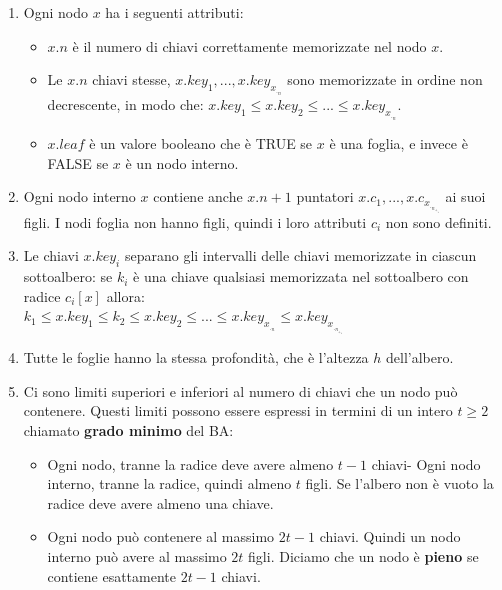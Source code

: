 \begin{enumerate}
    \item Ogni nodo $x$ ha i seguenti attributi:
    \begin{itemize}
        \item $x.n$ è il numero di chiavi correttamente memorizzate nel nodo $x$.
        \item Le $x.n$ chiavi stesse, $x.key_1,...,x.key_x_._n$ sono memorizzate in ordine non decrescente, in modo che: \(x.key_1\leq x.key_2\leq ...\leq x.key_x_._n\).
        \item $x.leaf$ è un valore booleano che è TRUE se $x$ è una foglia, e invece è FALSE se $x$ è un nodo interno.
    \end{itemize}
    \item Ogni nodo interno $x$ contiene anche $x.n+1$ puntatori $x.c_1 ,...,x.c_x_._n_+_1$ ai suoi figli. I nodi foglia non hanno figli, quindi i loro attributi $c_i$ non sono definiti.
    \item Le chiavi $x.key_i$ separano gli intervalli delle chiavi memorizzate in ciascun sottoalbero: se $k_i$ è una chiave qualsiasi memorizzata nel sottoalbero con radice $c_i[x]$ allora:\\
    \(k_1\leq x.key_1\leq k_2\leq x.key_2\leq ...\leq x.key_x_._n\leq x.key_x_._n_+_1\)
    \item Tutte le foglie hanno la stessa profondità, che è l'altezza $h$ dell'albero.
    \item Ci sono limiti superiori e inferiori al numero di chiavi che un nodo può contenere. Questi limiti possono essere espressi in termini di un intero \(t\geq2\) chiamato \textbf{grado minimo} del BA:
    \begin{itemize}
        \item Ogni nodo, tranne la radice deve avere almeno $t-1$ chiavi- Ogni nodo interno, tranne la radice, quindi almeno $t$ figli. Se l'albero non è vuoto la radice deve avere almeno una chiave.
        \item Ogni nodo può contenere al massimo $2t-1$ chiavi. Quindi un nodo interno può avere al massimo $2t$ figli. Diciamo che un nodo è \textbf{pieno} se contiene esattamente $2t-1$ chiavi.
    \end{itemize}
\end{enumerate}

